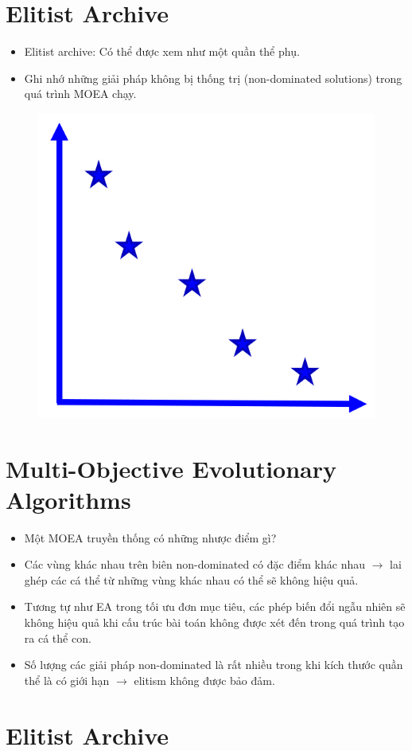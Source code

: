 \documentclass{book}
\begin{document}
\section*{Elitist Archive}

\begin{itemize}
    \item Elitist archive: Có thể được xem như một quần thể phụ.
    \item Ghi nhớ những giải pháp không bị thống trị (non-dominated solutions) trong quá trình MOEA chạy.
\end{itemize}

\begin{figure}[H]
    \centering
    \includegraphics[width=0.5\linewidth]{images/GA-7-8_57.png}
\end{figure}

\section*{Multi-Objective Evolutionary Algorithms}

\begin{itemize}
    \item Một MOEA truyền thống có những nhược điểm gì?
    \item Các vùng khác nhau trên biên non-dominated có đặc điểm khác nhau $\rightarrow$ lai ghép các cá thể từ những vùng khác nhau có thể sẽ không hiệu quả.
    \item Tương tự như EA trong tối ưu đơn mục tiêu, các phép biến đổi ngẫu nhiên sẽ không hiệu quả khi cấu trúc bài toán không được xét đến trong quá trình tạo ra cá thể con.
    \item Số lượng các giải pháp non-dominated là rất nhiều trong khi kích thước quần thể là có giới hạn $\rightarrow$ elitism không được bảo đảm.
\end{itemize}

\section*{Elitist Archive}
\end{document}
